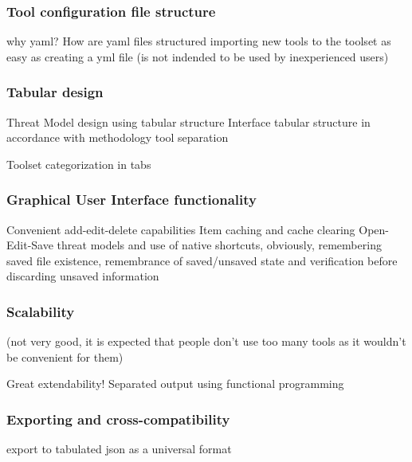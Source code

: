 	
	\subsubsection{Tool configuration file structure}
	why yaml? How are yaml files structured
	importing new tools to the toolset as easy as creating a yml file (is not indended to be used by inexperienced users)


	\subsubsection{Tabular design}
	Threat Model design using tabular structure 
	Interface tabular structure in accordance with methodology tool separation
	
	Toolset categorization in tabs 
	
	
	\subsubsection{Graphical User Interface functionality}
	Convenient add-edit-delete capabilities
	Item caching and cache clearing
	Open-Edit-Save threat models and use of native shortcuts, obviously, remembering saved file existence, remembrance of saved/unsaved state and verification before discarding unsaved information
	
	
	\subsubsection{Scalability}
	(not very good, it is expected that people don't use too many tools as it wouldn't be convenient for them)
	
	Great extendability! Separated output using functional programming


	\subsubsection{Exporting and cross-compatibility}
	 export to tabulated json as a universal format

